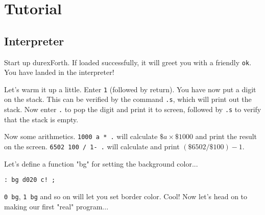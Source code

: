 \chapter{Tutorial}

\section{Interpreter}

Start up durexForth. If loaded successfully, it will greet you with a friendly \texttt{ok}. You have landed in the interpreter!

Let's warm it up a little. Enter \texttt{1} (followed by return). You have now put a digit on the stack. This can be verified by the command \texttt{.s}, which will print out the stack. Now enter \texttt{.} to pop the digit and print it to screen, followed by \texttt{.s} to verify that the stack is empty.

Now some arithmetics. \texttt{1000 a * .} will calculate $\$a \times \$1000$ and print the result on the screen. \texttt{6502 100 / 1- .} will calculate and print $(\$6502 / \$100) - 1$.

Let's define a function "bg" for setting the background color... 

\begin{verbatim}
: bg d020 c! ;
\end{verbatim}

\texttt{0 bg}, \texttt{1 bg} and so on will let you set border color. Cool! Now let's head on to making our first "real" program...

